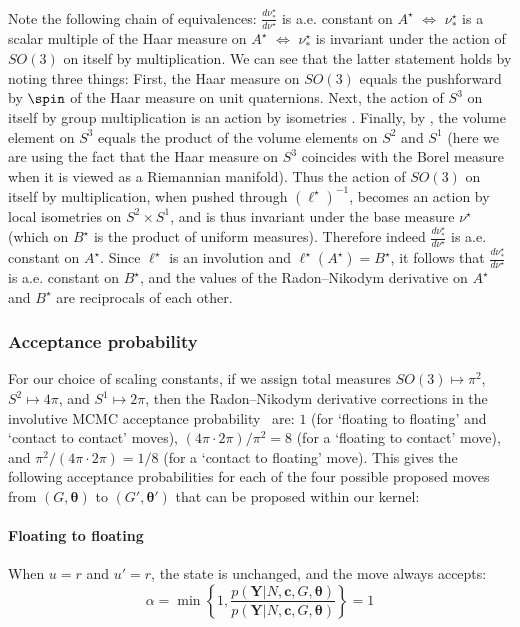 Note the following chain of equivalences: $\frac{d\nu^\star_*}{d\nu^\star}$ is a.e. constant on $A^\star$ $\iff$ $\nu^\star_*$ is a scalar multiple of the Haar measure on $A^\star$ $\iff$ $\nu^\star_*$ is invariant under the action of $SO(3)$ on itself by multiplication.
We can see that the latter statement holds by noting three things:
First, the Haar measure on $SO(3)$ equals the pushforward by $\spin$ of the Haar measure on unit quaternions.
Next, the action of $S^3$ on itself by group multiplication is an action by isometries \cite[\S8.3]{gallier2001quat}.
Finally, by \cite{yershova2010hopf}, the volume element on $S^3$ equals the product of the volume elements on $S^2$ and $S^1$ (here we are using the fact that the Haar measure on $S^3$ coincides with the Borel measure when it is viewed as a Riemannian manifold).
Thus the action of $SO(3)$ on itself by multiplication, when pushed through $(\ell^\star)^{-1}$, becomes an action by local isometries on $S^2 \times S^1$, and is thus invariant under the base measure $\nu^\star$ (which on $B^\star$ is the product of uniform measures).
Therefore indeed $\frac{d\nu^\star_*}{d\nu^\star}$ is a.e. constant on $A^\star$.
Since $\ell^\star$ is an involution and $\ell^\star(A^\star) = B^\star$, it follows that $\frac{d\nu^\star_*}{d\nu^\star}$ is a.e. constant on $B^\star$, and the values of the Radon--Nikodym derivative on $A^\star$ and $B^\star$ are reciprocals of each other.


\subsubsection{Acceptance probability}

For our choice of scaling constants, if we assign total measures $SO(3) \mapsto \pi^2$, $S^2 \mapsto 4 \pi$, and $S^1 \mapsto 2\pi$,
then the Radon--Nikodym derivative corrections in the involutive MCMC acceptance probability~\citep{cusumano2020automating} are:
$1$ (for `floating to floating' and `contact to contact' moves),
$(4 \pi \cdot 2 \pi)/\pi^2 = 8$ (for a `floating to contact' move), and
$\pi^2/(4 \pi \cdot 2 \pi) = 1/8$ (for a `contact to floating' move).
This gives the 
following acceptance probabilities for each of the four possible proposed moves from $(G, \bm\theta)$ to $(G', \bm\theta')$ that can be proposed within our kernel:

\paragraph{Floating to floating}
When $u = r$ and $u' = r$, the state is unchanged, and the move always accepts:
\begin{equation}
\alpha = \min\left\{
1, 
\frac{p(\mathbf{Y} | N, \mathbf{c}, G, \bm\theta)}{p(\mathbf{Y} | N, \mathbf{c}, G, \bm\theta)}
\right\} = 1
\end{equation}


